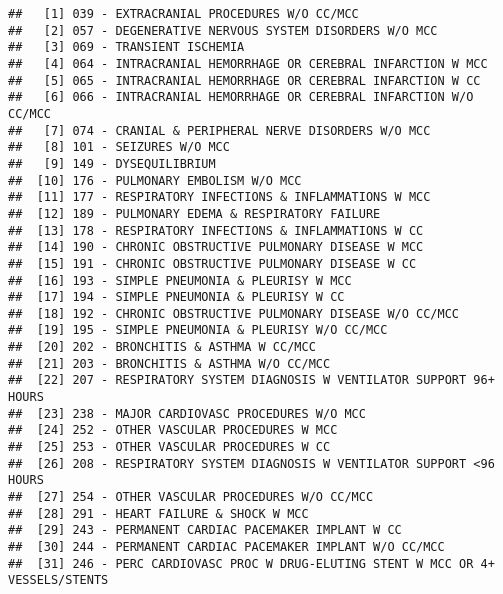 \documentclass[]{article}
\begin{document}
\begin{verbatim}
##   [1] 039 - EXTRACRANIAL PROCEDURES W/O CC/MCC                                  
##   [2] 057 - DEGENERATIVE NERVOUS SYSTEM DISORDERS W/O MCC                       
##   [3] 069 - TRANSIENT ISCHEMIA                                                  
##   [4] 064 - INTRACRANIAL HEMORRHAGE OR CEREBRAL INFARCTION W MCC                
##   [5] 065 - INTRACRANIAL HEMORRHAGE OR CEREBRAL INFARCTION W CC                 
##   [6] 066 - INTRACRANIAL HEMORRHAGE OR CEREBRAL INFARCTION W/O CC/MCC           
##   [7] 074 - CRANIAL & PERIPHERAL NERVE DISORDERS W/O MCC                        
##   [8] 101 - SEIZURES W/O MCC                                                    
##   [9] 149 - DYSEQUILIBRIUM                                                      
##  [10] 176 - PULMONARY EMBOLISM W/O MCC                                          
##  [11] 177 - RESPIRATORY INFECTIONS & INFLAMMATIONS W MCC                        
##  [12] 189 - PULMONARY EDEMA & RESPIRATORY FAILURE                               
##  [13] 178 - RESPIRATORY INFECTIONS & INFLAMMATIONS W CC                         
##  [14] 190 - CHRONIC OBSTRUCTIVE PULMONARY DISEASE W MCC                         
##  [15] 191 - CHRONIC OBSTRUCTIVE PULMONARY DISEASE W CC                          
##  [16] 193 - SIMPLE PNEUMONIA & PLEURISY W MCC                                   
##  [17] 194 - SIMPLE PNEUMONIA & PLEURISY W CC                                    
##  [18] 192 - CHRONIC OBSTRUCTIVE PULMONARY DISEASE W/O CC/MCC                    
##  [19] 195 - SIMPLE PNEUMONIA & PLEURISY W/O CC/MCC                              
##  [20] 202 - BRONCHITIS & ASTHMA W CC/MCC                                        
##  [21] 203 - BRONCHITIS & ASTHMA W/O CC/MCC                                      
##  [22] 207 - RESPIRATORY SYSTEM DIAGNOSIS W VENTILATOR SUPPORT 96+ HOURS         
##  [23] 238 - MAJOR CARDIOVASC PROCEDURES W/O MCC                                 
##  [24] 252 - OTHER VASCULAR PROCEDURES W MCC                                     
##  [25] 253 - OTHER VASCULAR PROCEDURES W CC                                      
##  [26] 208 - RESPIRATORY SYSTEM DIAGNOSIS W VENTILATOR SUPPORT <96 HOURS         
##  [27] 254 - OTHER VASCULAR PROCEDURES W/O CC/MCC                                
##  [28] 291 - HEART FAILURE & SHOCK W MCC                                         
##  [29] 243 - PERMANENT CARDIAC PACEMAKER IMPLANT W CC                            
##  [30] 244 - PERMANENT CARDIAC PACEMAKER IMPLANT W/O CC/MCC                      
##  [31] 246 - PERC CARDIOVASC PROC W DRUG-ELUTING STENT W MCC OR 4+ VESSELS/STENTS

\end{verbatim}
\end{document}
